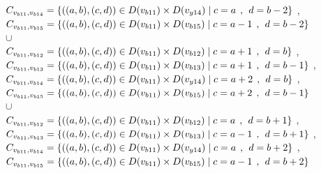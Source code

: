 \\$C_{v_{b11},v_{b14}}=\{((a,b),(c,d))\in D(v_{b11}) \times D(v_{y14})\mid c = a  \hspace{1ex} , \hspace{1ex}  d = b - 2 \}$ , 
\\$C_{v_{b11},v_{b15}}=\{((a,b),(c,d))\in D(v_{b11}) \times D(v_{b15})\mid c = a - 1\hspace{1ex} , \hspace{1ex}  d = b - 2 \}$  
\\$\cup$
\\$C_{v_{b11},v_{b12}}=\{((a,b),(c,d))\in D(v_{b11}) \times D(v_{b12})\mid c = a + 1\hspace{1ex} , \hspace{1ex}  d = b   \}$ , 
\\$C_{v_{b11},v_{b13}}=\{((a,b),(c,d))\in D(v_{b11}) \times D(v_{b13})\mid c = a + 1\hspace{1ex} , \hspace{1ex}  d = b - 1 \}$ , 
\\$C_{v_{b11},v_{b14}}=\{((a,b),(c,d))\in D(v_{b11}) \times D(v_{y14})\mid c = a + 2\hspace{1ex} , \hspace{1ex}  d = b   \}$ , 
\\$C_{v_{b11},v_{b15}}=\{((a,b),(c,d))\in D(v_{b11}) \times D(v_{b15})\mid c = a + 2\hspace{1ex} , \hspace{1ex}  d = b - 1 \}$  
\\$\cup$
\\$C_{v_{b11},v_{b12}}=\{((a,b),(c,d))\in D(v_{b11}) \times D(v_{b12})\mid c = a  \hspace{1ex} , \hspace{1ex}  d = b + 1 \}$ , 
\\$C_{v_{b11},v_{b13}}=\{((a,b),(c,d))\in D(v_{b11}) \times D(v_{b13})\mid c = a - 1\hspace{1ex} , \hspace{1ex}  d = b + 1 \}$ , 
\\$C_{v_{b11},v_{b14}}=\{((a,b),(c,d))\in D(v_{b11}) \times D(v_{y14})\mid c = a  \hspace{1ex} , \hspace{1ex}  d = b + 2 \}$ , 
\\$C_{v_{b11},v_{b15}}=\{((a,b),(c,d))\in D(v_{b11}) \times D(v_{b15})\mid c = a - 1\hspace{1ex} , \hspace{1ex}  d = b + 2 \}$  
